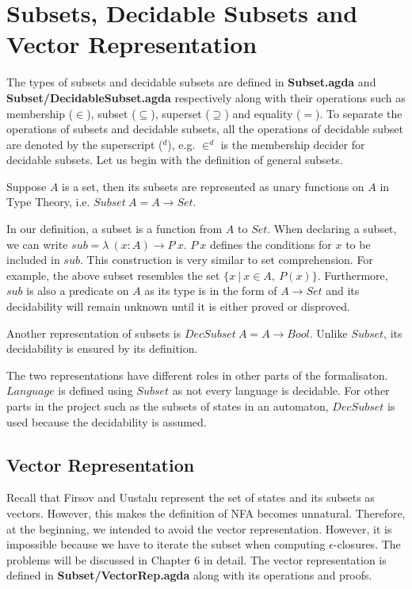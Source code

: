 \section{Subsets, Decidable Subsets and Vector Representation}
\par The types of subsets and decidable subsets are defined in
\textbf{Subset.agda} and \textbf{Subset/DecidableSubset.agda}
respectively along with their operations such as membership (\(\in\)), subset
(\(\subseteq\)), superset (\(\supseteq\)) and equality (\(=\)). To separate the
operations of subsets and decidable subsets, all the operations of
decidable subset are denoted by the superscript (\(^d\)), e.g. \(\in^d\)
is the membership decider for decidable subsets. Let us
begin with the definition of general subsets. 

\begin{defn} 
\noindent Suppose \(A\) is a set, then its
subsets are represented as unary functions on
\(A\) in Type Theory, i.e. \(Subset\ A = A \to Set\). 
\end{defn}

\par In our definition, a subset is a function from \(A\) to
\(Set\). When declaring a subset, we can write \(sub =
\lambda\ (x : A) \to P\ x\). \(P\ x\) defines the conditions for \(x\) to
be included in \(sub\). This construction is
very similar to set comprehension. For example, the above subset
resembles the set \(\{x\ | \ x \in A,\ P(x)\}\). Furthermore, \(sub\) is
also a predicate on \(A\) as its type is in the form of \(A \to
Set\) and its decidability will remain unknown until it is either proved or disproved. 

\begin{defn} 
\noindent Another representation of subsets is \(DecSubset\ A = A \to
Bool\). Unlike \(Subset\), its decidability is ensured by its
definition. 
\end{defn}

\par The two representations have different roles in other parts of the
formalisaton. \(Language\) is defined using \(Subset\) as not every
language is decidable. For other parts in the project 
such as the subsets of states in an automaton, \(DecSubset\) is used
because the decidability is assumed. 


\subsection{Vector Representation}
\par Recall that Firsov and Uustalu \cite{firsov2013} represent the
set of states and its subsets as vectors. However, this makes the definition of
NFA becomes unnatural. Therefore, at the beginning, we intended to
avoid the vector representation. However, it is impossible because we have to iterate the subset
when computing \(\epsilon\)-closures. The problems will be discussed in
Chapter 6 in detail. The vector representation is defined in
\textbf{Subset/VectorRep.agda} along with its operations and proofs. 

